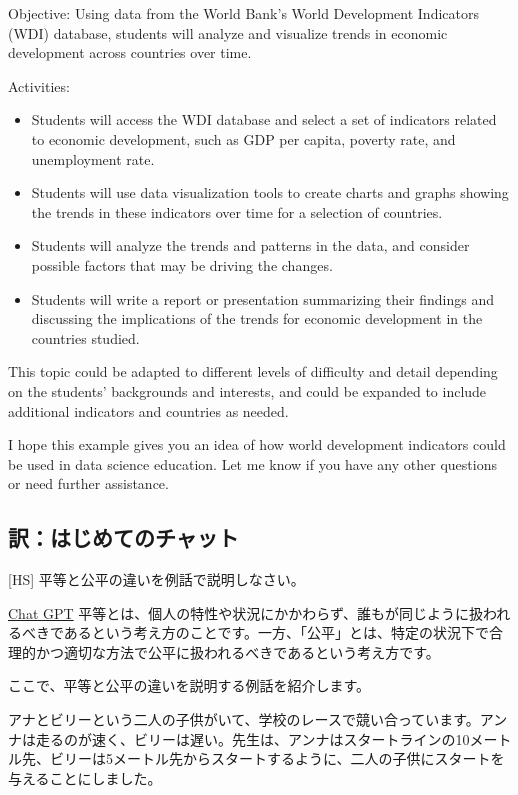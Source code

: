 \documentclass[
]{book}
\providecommand{\tightlist}{%
  \setlength{\itemsep}{0pt}\setlength{\parskip}{0pt}}
\theoremstyle{definition}
\theoremstyle{definition}
\theoremstyle{definition}
\theoremstyle{definition}
\theoremstyle{remark}
\begin{document}
Objective: Using data from the World Bank's World Development Indicators (WDI) database, students will analyze and visualize trends in economic development across countries over time.

Activities:

\begin{itemize}
\tightlist
\item
  Students will access the WDI database and select a set of indicators related to economic development, such as GDP per capita, poverty rate, and unemployment rate.
\item
  Students will use data visualization tools to create charts and graphs showing the trends in these indicators over time for a selection of countries.
\item
  Students will analyze the trends and patterns in the data, and consider possible factors that may be driving the changes.
\item
  Students will write a report or presentation summarizing their findings and discussing the implications of the trends for economic development in the countries studied.
\end{itemize}

This topic could be adapted to different levels of difficulty and detail depending on the students' backgrounds and interests, and could be expanded to include additional indicators and countries as needed.

I hope this example gives you an idea of how world development indicators could be used in data science education. Let me know if you have any other questions or need further assistance.

\hypertarget{firstchatj}{%
\subsection{訳：はじめてのチャット}\label{firstchatj}}

{[}HS{]} 平等と公平の違いを例話で説明しなさい。

\protect\hyperlink{chatgpt}{Chat GPT} 平等とは、個人の特性や状況にかかわらず、誰もが同じように扱われるべきであるという考え方のことです。一方、「公平」とは、特定の状況下で合理的かつ適切な方法で公平に扱われるべきであるという考え方です。

ここで、平等と公平の違いを説明する例話を紹介します。

アナとビリーという二人の子供がいて、学校のレースで競い合っています。アンナは走るのが速く、ビリーは遅い。先生は、アンナはスタートラインの10メートル先、ビリーは5メートル先からスタートするように、二人の子供にスタートを与えることにしました。
\end{document}

